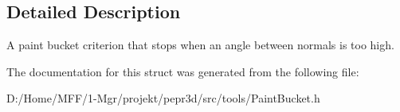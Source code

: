 \subsection{Detailed Description}
A paint bucket criterion that stops when an angle between normals is too high. 

The documentation for this struct was generated from the following file\+:\begin{DoxyCompactItemize}
\item 
D\+:/\+Home/\+M\+F\+F/1-\/\+Mgr/projekt/pepr3d/src/tools/Paint\+Bucket.\+h\end{DoxyCompactItemize}
